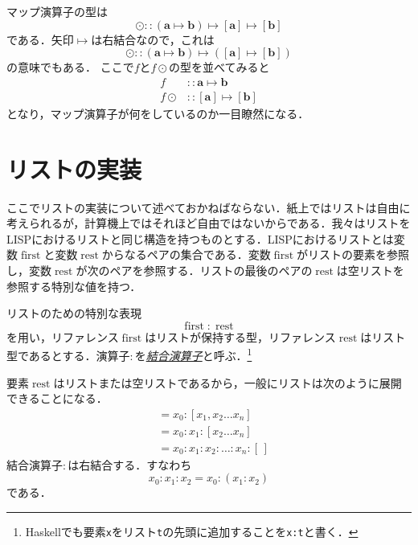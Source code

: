 \documentclass[a5paper,draft]{jsbook}
\newcommand{\programminglanguage}[1]{\textsf{#1}}
\newcommand{\haskell}{\programminglanguage{Haskell}}
\newcommand{\lisp}{\programminglanguage{LISP}}
\newcommand{\keyword}[1]{{\underline{\emph{#1}}}}
\newcommand{\code}[1]{\texttt{#1}}
\newcommand{\mathTypeParameter}[1]{\mathbf{#1}}
\newcommand{\mathListType}[1]{\left[#1\right]}
\newcommand{\mathEmptyList}{{[\,]}}
\newcommand{\mathIn}{\mathrel{::}}
\newcommand{\mathMap}{\mathbin{\odot}}
\newcommand{\mathMapsTo}{\mapsto}
\newcommand{\mathVarKeyword}[1]{\operatorname{\mathrm{#1}}}
\newcommand{\mathFirst}{\mathVarKeyword{first}}
\newcommand{\mathRest}{\mathVarKeyword{rest}}
\newcommand{\mathMorph}[2]{#1\mathMapsTo#2}
\newcommand{\mathMorphII}[3]{#1\mathMapsTo#2\mathMapsTo#3}
\begin{document}
マップ演算子の型は
\begin{equation}
\mathMap\mathIn{}\mathMorphII{(\mathMorph{\mathTypeParameter{a}}{\mathTypeParameter{b}})}{\mathListType{\mathTypeParameter{a}}}{\mathListType{\mathTypeParameter{b}}}
\end{equation}
である．矢印$\mathMapsTo$は右結合なので，これは
\begin{equation}
\mathMap\mathIn\mathMorph{(\mathMorph{\mathTypeParameter{a}}{\mathTypeParameter{b}})}{\left(\mathMorph{\mathListType{\mathTypeParameter{a}}}{\mathListType{\mathTypeParameter{b}}}\right)}
\end{equation}
の意味でもある．
ここで$f$と$f\mathMap$の型を並べてみると
\begin{align}
f&\mathIn\mathMorph{\mathTypeParameter{a}}{\mathTypeParameter{b}}\\
f\mathMap&\mathIn\mathMorph{\mathListType{\mathTypeParameter{a}}}{\mathListType{\mathTypeParameter{b}}}
\end{align}
となり，マップ演算子が何をしているのか一目瞭然になる．

\section{リストの実装}

ここでリストの実装について述べておかねばならない．紙上ではリストは自由に考えられるが，計算機上ではそれほど自由ではないからである．我々はリストを\lisp におけるリストと同じ構造を持つものとする．\lisp におけるリストとは変数$\mathFirst$と変数$\mathRest$からなるペアの集合である．変数$\mathFirst$がリストの要素を参照し，変数$\mathRest$が次のペアを参照する．リストの最後のペアの$\mathRest$は空リストを参照する特別な値を持つ．

リストのための特別な表現
\begin{equation}
\mathFirst:\mathRest
\end{equation}
を用い，リファレンス$\mathFirst$はリストが保持する型，リファレンス$\mathRest$はリスト型であるとする．演算子$:$を\keyword{結合演算子}と呼ぶ．\footnote{\haskell でも要素\code{x}をリスト\code{t}の先頭に追加することを\code{x:t}と書く．}

要素$\mathRest$はリストまたは空リストであるから，一般にリストは次のように展開できることになる．
\begin{align*}
[x_0,x_1,x_2\dots x_n]&=x_0:[x_1,x_2\dots x_n]\\
&=x_0:x_1:[x_2\dots x_n]\\
&=x_0:x_1:x_2:\dots:x_n:\mathEmptyList
\end{align*}
結合演算子$:$は右結合する．すなわち$$x_0:x_1:x_2=x_0:(x_1:x_2)$$である．
\end{document}
